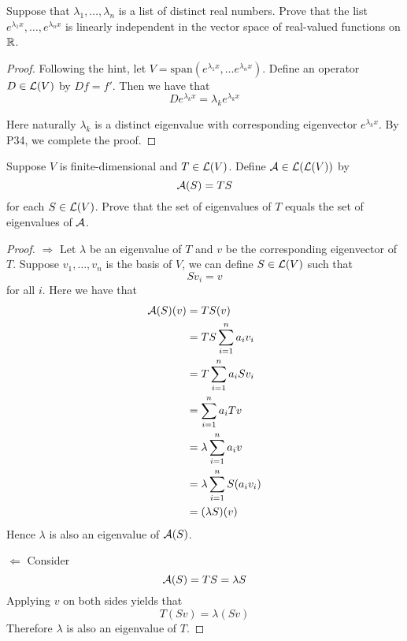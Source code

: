\documentclass{extarticle}
\begin{document}
\begin{problem}{35}
    Suppose that \(\lambda_1, \ldots, \lambda_n\) is a list of distinct real numbers. Prove that 
    the list \(e^{\lambda_1 x}, \ldots, e^{\lambda_n x}\) is linearly independent in the vector 
    space of real-valued functions on \(\mathbb{R}\).
\end{problem}

\begin{proof}
Following the hint, let \(V = \text{span}(e^{\lambda_1 x}, \ldots e^{\lambda_n x})\). Define 
an operator \(D \in \mathcal{L}(V)\) by \(Df = f'\). Then we have that 
\[D e^{\lambda_k x} = \lambda_k e^{\lambda_k x}\]

Here naturally \(\lambda_k\) is a distinct eigenvalue with corresponding eigenvector \(e^{\lambda_k x}\). 
By P34, we complete the proof. 
\end{proof}


\begin{problem}{37}
    Suppose \(V\) is finite-dimensional and \(T \in \mathcal{L}(V)\). Define \(\mathcal{A} \in \mathcal{L}(\mathcal{L}(V))\) by 
    \[\mathcal{A}(S) = TS\]
    for each \(S \in \mathcal{L}(V)\). Prove that the set of eigenvalues of \(T\) equals the set of 
    eigenvalues of \(\mathcal{A}\).
\end{problem}

\begin{proof}
    \(\Rightarrow\) Let \(\lambda\) be an eigenvalue of \(T\) and \(v\) be the corresponding 
    eigenvector of \(T\).  Suppose \(v_1, \ldots, v_n\) is the basis of \(V\), we can define 
    \(S \in \mathcal{L}(V)\) such that 
    \[S v_i = v\]
    for all \(i\). Here we have that 
    \begin{align*}
        \mathcal{A}(S)(v) 
        &= TS(v) \\ 
        &= TS \sum_{i=1}^{n} a_i v_i \\ 
        &= T\sum_{i=1}^{n} a_i Sv_i \\ 
        &= \sum_{i=1}^{n} a_i Tv \\ 
        &= \lambda \sum_{i=1}^{n} a_i v  \\ 
        &= \lambda \sum_{i=1}^{n} S (a_i v_i) \\ 
        &= (\lambda S) (v) 
    \end{align*}
    Hence \(\lambda\) is also an eigenvalue of \(\mathcal{A}(S)\).


    \(\Leftarrow\) Consider 
    \[\mathcal{A}(S) = TS = \lambda S\] 
    Applying \(v\) on both sides yields that 
    \[T(Sv) = \lambda(Sv)\]
    Therefore \(\lambda\) is also an eigenvalue of \(T\).
\end{proof}
\end{document}
